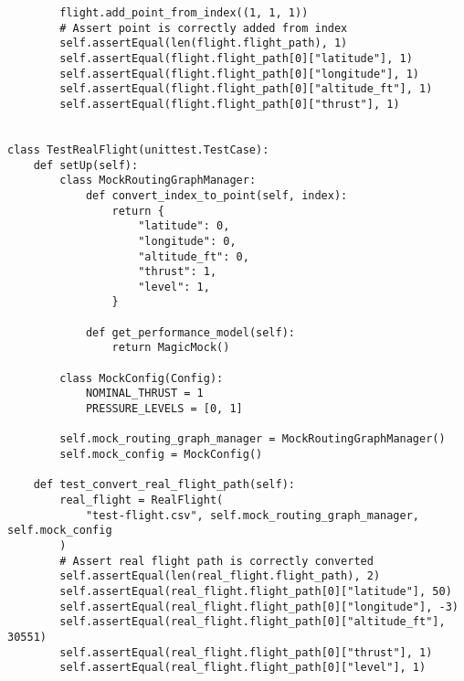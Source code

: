 \begin{verbatim}
        flight.add_point_from_index((1, 1, 1))
        # Assert point is correctly added from index
        self.assertEqual(len(flight.flight_path), 1)
        self.assertEqual(flight.flight_path[0]["latitude"], 1)
        self.assertEqual(flight.flight_path[0]["longitude"], 1)
        self.assertEqual(flight.flight_path[0]["altitude_ft"], 1)
        self.assertEqual(flight.flight_path[0]["thrust"], 1)


class TestRealFlight(unittest.TestCase):
    def setUp(self):
        class MockRoutingGraphManager:
            def convert_index_to_point(self, index):
                return {
                    "latitude": 0,
                    "longitude": 0,
                    "altitude_ft": 0,
                    "thrust": 1,
                    "level": 1,
                }

            def get_performance_model(self):
                return MagicMock()

        class MockConfig(Config):
            NOMINAL_THRUST = 1
            PRESSURE_LEVELS = [0, 1]

        self.mock_routing_graph_manager = MockRoutingGraphManager()
        self.mock_config = MockConfig()

    def test_convert_real_flight_path(self):
        real_flight = RealFlight(
            "test-flight.csv", self.mock_routing_graph_manager, self.mock_config
        )
        # Assert real flight path is correctly converted
        self.assertEqual(len(real_flight.flight_path), 2)
        self.assertEqual(real_flight.flight_path[0]["latitude"], 50)
        self.assertEqual(real_flight.flight_path[0]["longitude"], -3)
        self.assertEqual(real_flight.flight_path[0]["altitude_ft"], 30551)
        self.assertEqual(real_flight.flight_path[0]["thrust"], 1)
        self.assertEqual(real_flight.flight_path[0]["level"], 1)

\end{verbatim}
